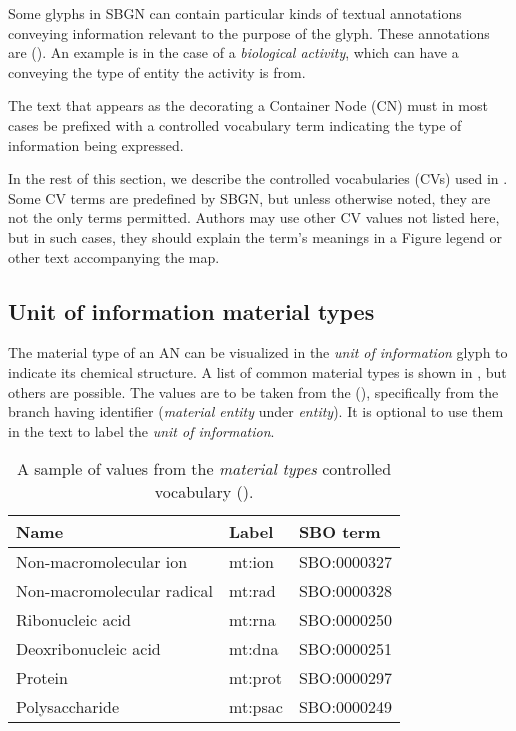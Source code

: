 
\normalcolor

Some glyphs in SBGN \AF can contain particular kinds of textual annotations conveying information relevant to the purpose of the glyph.  These annotations are  ().  An example is in the case of a \emph{biological activity}, which can have a  conveying the type of entity the activity is from.

The text that appears as the  decorating a Container Node (CN) must in most cases be prefixed with a controlled vocabulary term indicating the type of information being expressed.

In the rest of this section, we describe the controlled vocabularies (CVs) used in \SBGNAFLone. Some CV terms are predefined by SBGN, but unless otherwise noted, they are not the only terms permitted. Authors may use other CV values not listed here, but in such cases, they should explain the term's meanings in a Figure legend or other text accompanying the map.

\subsection{Unit of information material types}
\label{sec:af:material-types-cv}

The material type of an AN can be visualized in the \emph{unit of information} glyph to indicate its chemical structure.  A list of common material types is shown in , but others are possible. The values are to be taken from the \sbo (\sbourl), specifically from the branch having identifier  ($\!$\emph{material entity} under \emph{entity}). It is optional to use them in the text to label the \emph{unit of information}. 

\begin{table}[h]
  \centering
  \begin{tabular}{l>{\ttfamily}l>{\ttfamily}l}
    \toprule
    \textbf{Name}              & \textbf{\rmfamily Label} & \textbf{\rmfamily SBO term} \\
    \midrule
    Non-macromolecular ion     & mt:ion  & SBO:0000327\\
    Non-macromolecular radical & mt:rad  & SBO:0000328\\
    Ribonucleic acid           & mt:rna  & SBO:0000250\\
    Deoxribonucleic acid       & mt:dna  & SBO:0000251\\
    Protein                    & mt:prot & SBO:0000297\\
    Polysaccharide             & mt:psac & SBO:0000249\\
    \bottomrule
  \end{tabular}
  \caption{A sample of values from the \emph{material types} controlled
    vocabulary ().}
  \label{tab:af:material-types-cv}
\end{table}

